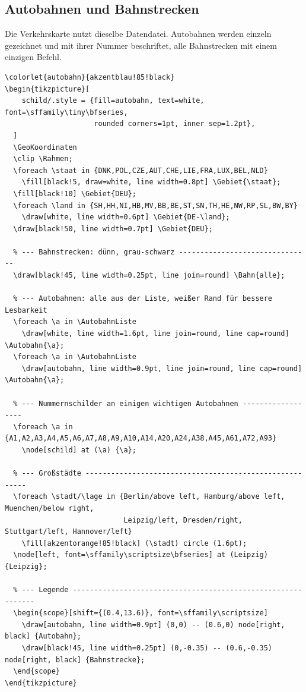 \subsection{Autobahnen und Bahnstrecken}

Die Verkehrskarte nutzt dieselbe Datendatei. Autobahnen werden einzeln gezeichnet und mit ihrer Nummer beschriftet, alle Bahnstrecken mit einem einzigen Befehl.

\begin{lstlisting}[style=latex]
% Präambel: 
\colorlet{autobahn}{akzentblau!85!black}
\begin{tikzpicture}[
    schild/.style = {fill=autobahn, text=white, font=\sffamily\tiny\bfseries,
                     rounded corners=1pt, inner sep=1.2pt},
  ]
  \GeoKoordinaten
  \clip \Rahmen;
  \foreach \staat in {DNK,POL,CZE,AUT,CHE,LIE,FRA,LUX,BEL,NLD}
    \fill[black!5, draw=white, line width=0.8pt] \Gebiet{\staat};
  \fill[black!10] \Gebiet{DEU};
  \foreach \land in {SH,HH,NI,HB,MV,BB,BE,ST,SN,TH,HE,NW,RP,SL,BW,BY}
    \draw[white, line width=0.6pt] \Gebiet{DE-\land};
  \draw[black!50, line width=0.7pt] \Gebiet{DEU};

  % --- Bahnstrecken: dünn, grau-schwarz -------------------------------
  \draw[black!45, line width=0.25pt, line join=round] \Bahn{alle};

  % --- Autobahnen: alle aus der Liste, weißer Rand für bessere Lesbarkeit
  \foreach \a in \AutobahnListe
    \draw[white, line width=1.6pt, line join=round, line cap=round] \Autobahn{\a};
  \foreach \a in \AutobahnListe
    \draw[autobahn, line width=0.9pt, line join=round, line cap=round] \Autobahn{\a};

  % --- Nummernschilder an einigen wichtigen Autobahnen ------------------
  \foreach \a in {A1,A2,A3,A4,A5,A6,A7,A8,A9,A10,A14,A20,A24,A38,A45,A61,A72,A93}
    \node[schild] at (\a) {\a};

  % --- Großstädte --------------------------------------------------------
  \foreach \stadt/\lage in {Berlin/above left, Hamburg/above left, Muenchen/below right,
                            Leipzig/left, Dresden/right, Stuttgart/left, Hannover/left}
    \fill[akzentorange!85!black] (\stadt) circle (1.6pt);
  \node[left, font=\sffamily\scriptsize\bfseries] at (Leipzig) {Leipzig};

  % --- Legende -------------------------------------------------------------
  \begin{scope}[shift={(0.4,13.6)}, font=\sffamily\scriptsize]
    \draw[autobahn, line width=0.9pt] (0,0) -- (0.6,0) node[right, black] {Autobahn};
    \draw[black!45, line width=0.25pt] (0,-0.35) -- (0.6,-0.35) node[right, black] {Bahnstrecke};
  \end{scope}
\end{tikzpicture}
\end{lstlisting}

